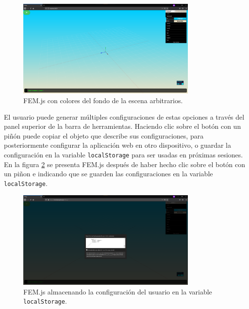 \begin{figure}[ht]
  \centering
  \includegraphics[width=0.8\textwidth]{FEM.js/dat-gui.png}
  \caption{FEM.js con colores del fondo de la escena arbitrarios.}
  \label{fig:FEM.js-background}
\end{figure}

El usuario puede generar múltiples configuraciones de estas opciones a través del panel superior de la barra de herramientas. Haciendo clic sobre el botón con un piñón puede copiar el objeto que describe sus configuraciones, para posteriormente configurar la aplicación web en otro dispositivo, o guardar la configuración en la variable \verb|localStorage| para ser usadas en próximas sesiones.\\

En la figura \ref{fig:FEM.js-user-preferences} se presenta FEM.js después de haber hecho clic sobre el botón con un piñon e indicando que se guarden las configuraciones en la variable \verb|localStorage|.\\

\begin{figure}[h!]
  \centering
  \includegraphics[width=0.8\textwidth]{FEM.js/dat-gui-user-preferences.png}
  \caption{FEM.js almacenando la configuración del usuario en la variable \texttt{localStorage}.}
  \label{fig:FEM.js-user-preferences}
\end{figure}

